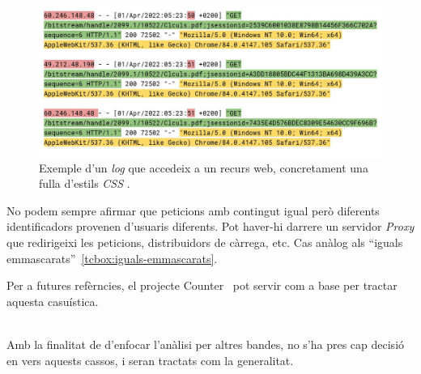 \begin{figure}[htbp]
    \centerline{\includegraphics[width=\textwidth]{figures/log-repetitions}}
    \captionsetup{justification=centering}
    \caption{Exemple d'un \textit{log} que accedeix a un recurs web, concretament una fulla d'estils \textit{\gls{CSS}} .}\label{fig:log-web-resource}
\end{figure}

\begin{tcolorbox}[colback=green!5!white, colframe=green!50!black, title=Divergència relativa]
    No podem sempre afirmar que peticions amb contingut igual però diferents identificadors provenen d'usuaris diferents.
    Pot haver-hi darrere un servidor \textit{Proxy} que redirigeixi les peticions, distribuidors de càrrega, etc.
    \tcblower
    Cas anàlog als ``iguals emmascarats''~\ref{tcbox:iguals-emmascarats}.
\end{tcolorbox}

\noindent
\begin{tcolorbox}[colback=blue!5!white, colframe=blue!75!black, title=Counter]
    Per a futures refèrncies, el projecte Counter~\cite{counter} pot servir com a base per tractar aquesta casuística.
\end{tcolorbox}

\noindent \\
Amb la finalitat de d'enfocar l'anàlisi per altres bandes, no s'ha pres cap decisió en vers aquests cassos, i seran tractats com la generalitat.

%
